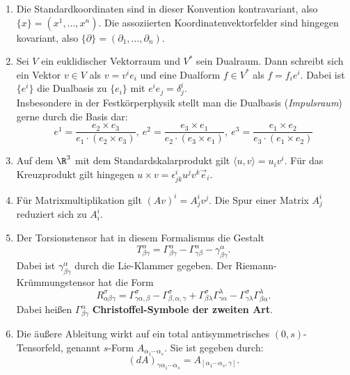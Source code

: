 \begin{beispiele}
\begin{enumerate}
\item Die Standardkoordinaten sind in dieser Konvention kontravariant, also $\{x\}=(x^1, \dots, x^n)$. Die assoziierten Koordinatenvektorfelder sind hingegen kovariant, also $\{\partial \}=(\partial_1, \dots, \partial_n)$.
\item Sei $V$ ein euklidischer Vektorraum und $V^\ast$ sein Dualraum. Dann schreibt sich ein Vektor $v \in V$ als $v = v^ie_i$ und eine Dualform $f \in V^\ast$ als $f = f_ie^i$. Dabei ist $\{e^i\}$ die Dualbasis zu $\{e_i\}$ mit $e^ie_j = \delta^i_j$.\\
Insbesondere in der Festkörperphysik stellt man die Dualbasis (\textit{Impulsraum}) gerne durch die Basis dar:
\begin{equation}
e^1 = \frac{e_2 \times e_3}{e_1 \cdot (e_2 \times e_3)}, \ e^2= \frac{e_3 \times e_1}{e_2 \cdot (e_3 \times e_1)}, \ e^3 = \frac{e_1 \times e_2}{e_3 \cdot (e_1 \times e_2)}
\end{equation}
\item Auf dem $\R^3$ mit dem Standardskalarprodukt gilt $\langle u, v \rangle = u_iv^i$. Für das Kreuzprodukt gilt hingegen $u \times v = \epsilon^i_{jk} u^j v^k \vec{e}_i$.
\item Für Matrixmultiplikation gilt $(Av)^i = A^i_j v^j$. Die Spur einer Matrix $A^i_j$ reduziert sich zu $A_i^i$.
\item Der Torsionstensor hat in diesem Formalismus die Gestalt 
\begin{equation}
T^\alpha_{\beta \gamma} = \Gamma^\alpha_{\beta \gamma} - \Gamma^\alpha_{\gamma \beta} - \gamma^\alpha_{\beta \gamma}.
\end{equation}
Dabei ist $\gamma^\alpha_{\beta \gamma}$ durch die Lie-Klammer gegeben. Der Riemann-Krümmungstensor hat die Form
\begin{equation}
R^\sigma_{\alpha \beta \gamma} = \Gamma^\sigma_{\gamma \alpha, \beta} - \Gamma^\sigma_{\beta, \alpha, \gamma} + \Gamma^\sigma_{\beta \lambda}\Gamma^\lambda_{\gamma \alpha} - \Gamma^\sigma_{\gamma \lambda}\Gamma^\lambda_{\beta \alpha}.
\end{equation}
Dabei heißen $\Gamma^\alpha_{\beta \gamma}$ \textbf{Christoffel-Symbole der zweiten Art}.
\item Die äußere Ableitung wirkt auf ein total antisymmetrisches $(0,s)$-Tensorfeld, genannt $s$-Form $A_{\alpha_1 \cdots \alpha_s}$. Sie ist gegeben durch:
\begin{equation}
(dA)_{\gamma \alpha_1 \cdots \alpha_s} = A_{[\alpha_1 \cdots \alpha_s, \gamma]}.
\end{equation}
\end{enumerate}
\end{beispiele}
